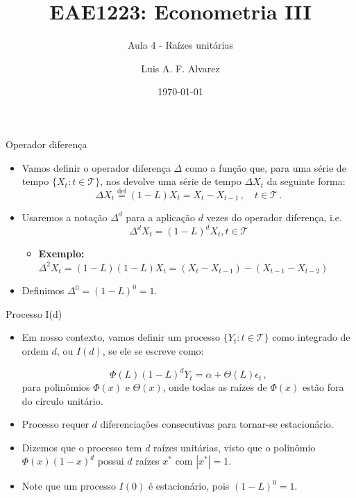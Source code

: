 \documentclass[11pt]{beamer}
\author{Luis A. F. Alvarez}
\title{EAE1223: Econometria III}
\subtitle{Aula 4 - Raízes unitárias}
\date{\today}
\begin{document}
\begin{frame}[plain]
	\maketitle
\end{frame}
\begin{frame}{Operador diferença}
	\begin{itemize}
		\item Vamos definir o operador diferença $\Delta$ como a função que, para uma série de tempo $\{X_t : t \in \mathcal{T}\}$, nos devolve uma série de tempo $\Delta X_t$ da seguinte forma:
		$$\Delta X_t \overset{\operatorname{def}}{=} (1-L)X_t = X_t - X_{t-1}\,, \quad t \in \mathcal{T}\, .$$
		\item Usaremos a notação $\Delta^d$ para a aplicação $d$ vezes do operador diferença, i.e.
		$$\Delta^d X_t = (1-L)^d X_t, t \in \mathcal{T}$$
		\begin{itemize}
			\item \textbf{Exemplo:} $\Delta^2 X_t = (1-L)(1-L)X_t = (X_t - X_{t-1}) - (X_{t-1} - X_{t-2})$
		\end{itemize}
		\item Definimos $\Delta^0 =(1-L)^0 = 1$.
	\end{itemize}
\end{frame}
\begin{frame}{Processo I(d)}
	\begin{itemize}
		\item Em nosso contexto, vamos definir um processo $\{Y_t:t \in \mathcal{T}\}$ {\color{blue}como integrado de ordem $d$, ou $I(d)$}, se ele se escreve como:
		
		$$\Phi(L)(1-L)^dY_t = \alpha + \Theta(L) \epsilon_t \, ,$$
		para polinômios $\Phi(x)$ e $\Theta(x)$, onde todas as raízes de $\Phi(x)$ estão fora do círculo unitário.
		\item Processo requer $d$ diferenciações consecutivas para tornar-se estacionário.
		\item Dizemos que o processo tem $d$ raízes unitárias, visto que o polinômio $\Phi(x)(1-x)^d$ possui $d$ raízes $x^*$ com $|x^*|=1$.
		\item Note que um processo $I(0)$ é estacionário, pois $(1-L)^0=1$.
	\end{itemize}
\end{frame}
\end{document}
